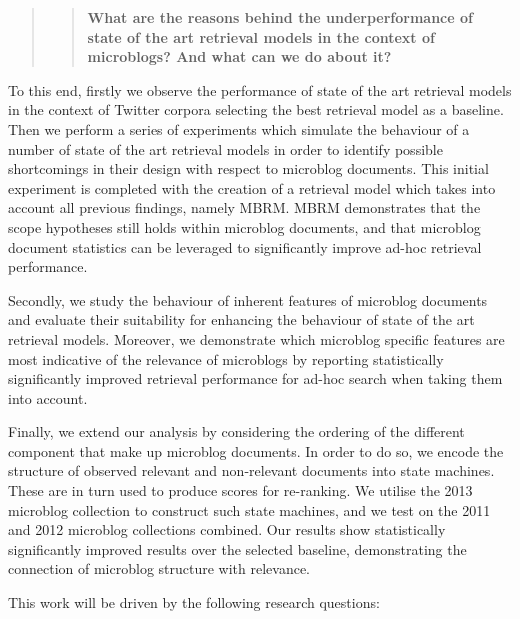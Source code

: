 \begin{quotation}\begin{quote}\textbf{What are the reasons behind the underperformance of state of the art retrieval models in the context of microblogs? And what can we do about it?}\end{quote}\end{quotation}

To this end, firstly we observe the performance of state of the art retrieval models in the context of Twitter corpora selecting the best retrieval model as a baseline. Then we perform a series of experiments which simulate the behaviour of a number of state of the art retrieval models in order to identify possible shortcomings in their design with respect to microblog documents. This initial experiment is completed with the creation of a retrieval model which takes into account all previous findings, namely MBRM. MBRM demonstrates that the scope hypotheses still holds within microblog documents, and that microblog document statistics can be leveraged to significantly improve ad-hoc retrieval performance.

Secondly, we study the behaviour of inherent features of microblog documents and evaluate their suitability for enhancing the behaviour of state of the art retrieval models. Moreover, we demonstrate which microblog specific features are most indicative of the relevance of microblogs by reporting statistically significantly improved retrieval performance for ad-hoc search when taking them into account.

Finally, we extend our analysis by considering the ordering of the different component that make up microblog documents. In order to do so, we encode the structure of observed relevant and non-relevant documents into state machines. These are in turn used to produce scores for re-ranking. We utilise the 2013 microblog collection to construct such state machines, and we test on the 2011 and 2012 microblog collections combined. Our results show statistically significantly improved results over the selected baseline, demonstrating the connection of microblog structure with relevance.

This work will be driven by the following research questions:

